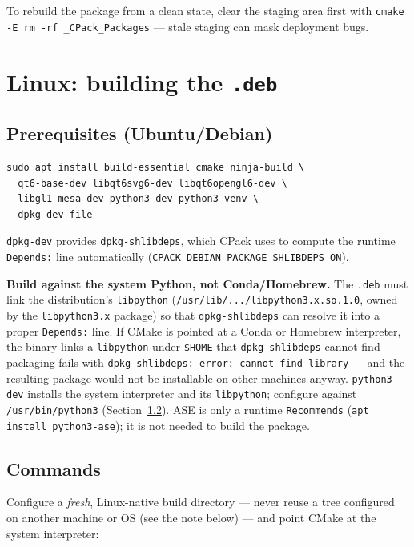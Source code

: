 \documentclass[11pt,a4paper]{article}
\newcommand{\file}[1]{\texttt{#1}}
\newcommand{\opt}[1]{\texttt{#1}}
\begin{document}
To rebuild the package from a clean state, clear the staging area first
with \lstinline|cmake -E rm -rf _CPack_Packages| --- stale staging can
mask deployment bugs.

\section{Linux: building the \file{.deb}}

\subsection{Prerequisites (Ubuntu/Debian)}

\begin{lstlisting}
sudo apt install build-essential cmake ninja-build \
  qt6-base-dev libqt6svg6-dev libqt6opengl6-dev \
  libgl1-mesa-dev python3-dev python3-venv \
  dpkg-dev file
\end{lstlisting}

\opt{dpkg-dev} provides \file{dpkg-shlibdeps}, which CPack uses to
compute the runtime \texttt{Depends:} line automatically
(\opt{CPACK\_DEBIAN\_PACKAGE\_SHLIBDEPS ON}).

\medskip
\noindent\textbf{Build against the system Python, not Conda/Homebrew.}
The \file{.deb} must link the distribution's \file{libpython}
(\file{/usr/lib/.../libpython3.x.so.1.0}, owned by the
\opt{libpython3.x} package) so that \file{dpkg-shlibdeps} can resolve it
into a proper \texttt{Depends:} line. If CMake is pointed at a Conda or
Homebrew interpreter, the binary links a \file{libpython} under
\file{\$HOME} that \file{dpkg-shlibdeps} cannot find --- packaging fails
with \texttt{dpkg-shlibdeps: error: cannot find library} --- and the
resulting package would not be installable on other machines anyway.
\file{python3-dev} installs the system interpreter and its
\file{libpython}; configure against \file{/usr/bin/python3}
(Section~\ref{sec:deb-commands}). ASE is only a runtime
\texttt{Recommends} (\texttt{apt install python3-ase}); it is not needed
to build the package.

\subsection{Commands}
\label{sec:deb-commands}

Configure a \emph{fresh}, Linux-native build directory --- never reuse a
tree configured on another machine or OS (see the note below) --- and
point CMake at the system interpreter:
\end{document}
